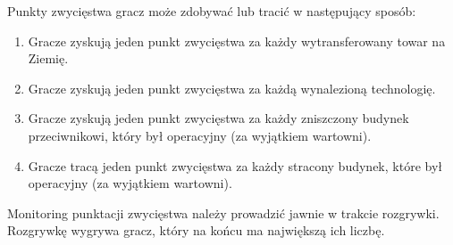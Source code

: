 \documentclass[11pt,a4paper]{article}
\begin{document}
Punkty zwycięstwa gracz może zdobywać lub tracić w następujący sposób:
\begin{enumerate}
  \setlength{\parskip}{0pt}
  \setlength{\itemsep}{0pt plus 1pt}
\item Gracze zyskują jeden punkt zwycięstwa za każdy wytransferowany towar na Ziemię.
\item Gracze zyskują jeden punkt zwycięstwa za każdą wynalezioną technologię.
\item Gracze zyskują jeden punkt zwycięstwa za każdy zniszczony budynek przeciwnikowi, który był operacyjny (za wyjątkiem wartowni).
\item Gracze tracą jeden punkt zwycięstwa za każdy stracony budynek, które był operacyjny (za wyjątkiem wartowni).
\end{enumerate}
Monitoring punktacji zwycięstwa należy prowadzić jawnie w trakcie rozgrywki. Rozgrywkę wygrywa gracz, który na końcu ma największą ich liczbę.
\end{document}
